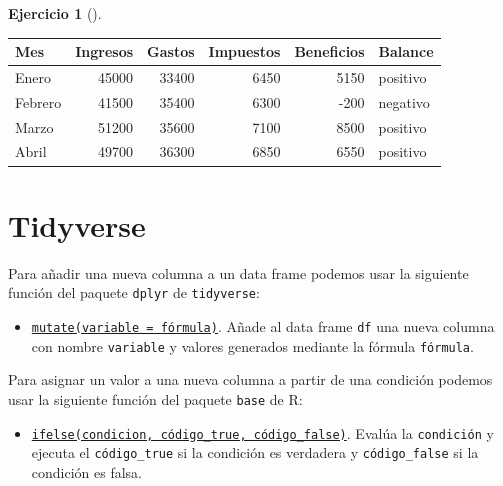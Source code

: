 \documentclass[
  a4paper,
]{scrreport}
\newenvironment{Shaded}{\begin{snugshade}}{\end{snugshade}}
\newcommand{\AttributeTok}[1]{\textcolor[rgb]{0.40,0.45,0.13}{#1}}
\newcommand{\DecValTok}[1]{\textcolor[rgb]{0.68,0.00,0.00}{#1}}
\newcommand{\FunctionTok}[1]{\textcolor[rgb]{0.28,0.35,0.67}{#1}}
\newcommand{\NormalTok}[1]{\textcolor[rgb]{0.00,0.23,0.31}{#1}}
\newcommand{\OtherTok}[1]{\textcolor[rgb]{0.00,0.23,0.31}{#1}}
\newcommand{\SpecialCharTok}[1]{\textcolor[rgb]{0.37,0.37,0.37}{#1}}
\newcommand{\StringTok}[1]{\textcolor[rgb]{0.13,0.47,0.30}{#1}}
\providecommand{\tightlist}{%
  \setlength{\itemsep}{0pt}\setlength{\parskip}{0pt}}\usepackage{longtable,booktabs,array}
\theoremstyle{definition}
\newtheorem{exercise}{Ejercicio}[chapter]
\theoremstyle{remark}
\begin{document}
\begin{exercise}[]
\begin{enumerate}
\begin{tcolorbox}
\begin{Shaded}
\end{Shaded}

  \begin{longtable}[]{@{}lrrrrl@{}}
  \toprule\noalign{}
  Mes & Ingresos & Gastos & Impuestos & Beneficios & Balance \\
  \midrule\noalign{}
  \endhead
  \bottomrule\noalign{}
  \endlastfoot
  Enero & 45000 & 33400 & 6450 & 5150 & positivo \\
  Febrero & 41500 & 35400 & 6300 & -200 & negativo \\
  Marzo & 51200 & 35600 & 7100 & 8500 & positivo \\
  Abril & 49700 & 36300 & 6850 & 6550 & positivo \\
  \end{longtable}

  \section{Tidyverse}

  Para añadir una nueva columna a un data frame podemos usar la
  siguiente función del paquete \texttt{dplyr} de \texttt{tidyverse}:

  \begin{itemize}
  \tightlist
  \item
    \href{https://dplyr.tidyverse.org/reference/mutate.html}{\texttt{mutate(variable\ =\ fórmula)}}.
    Añade al data frame \texttt{df} una nueva columna con nombre
    \texttt{variable} y valores generados mediante la fórmula
    \texttt{fórmula}.
  \end{itemize}

  Para asignar un valor a una nueva columna a partir de una condición
  podemos usar la siguiente función del paquete \texttt{base} de R:

  \begin{itemize}
  \tightlist
  \item
    \href{https://rdrr.io/r/base/ifelse.html}{\texttt{ifelse(condicion,\ código\_true,\ código\_false)}}.
    Evalúa la \texttt{condición} y ejecuta el \texttt{código\_true} si
    la condición es verdadera y \texttt{código\_false} si la condición
    es falsa.
  \end{itemize}


\end{tcolorbox}
\end{enumerate}
\end{exercise}
\end{document}

